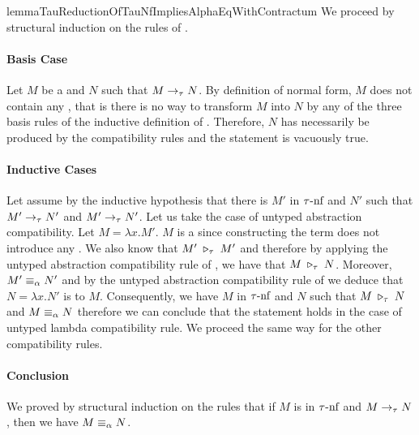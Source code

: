 \begin{longproof}{lemmaTauReductionOfTauNfImpliesAlphaEqWithContractum}
    We proceed by structural induction on the rules of \taureduction.

\paragraph{Basis Case}
    Let $M$ be a \taunormalform and $N$ such that $M \to_\tau N$. By definition of normal form, $M$ does not contain any \tauredex, that is there is no way to transform $M$ into $N$ by any of the three basis rules of the inductive definition of \taureduction. Therefore, $N$ has necessarily be produced by the compatibility rules and the statement is vacuously true.

\paragraph{Inductive Cases}
    Let assume by the inductive hypothesis that there is $M'$ in $\tau\text{-}\text{nf}$ and $N'$ such that $M' \to_\tau N'$ and $M' \to_\tau N'$. Let us take the case of untyped abstraction compatibility.
    Let $M=\lambda x.M'$. $M$ is a \taunormalform since constructing the term does not introduce any \tauredex. We also know that $M' \;\triangleright_\tau\; M'$ and therefore by applying the untyped abstraction compatibility rule of \taureduction, we have that $M \;\triangleright_\tau\; N$. Moreover, $M' \equiv_\alpha N'$ and by the untyped abstraction compatibility rule of \alphaequivalence we deduce that $N=\lambda x.N'$ is \alphaequivalent to $M$. Consequently, we have $M$ in $\tau\text{-}\text{nf}$ and $N$ such that $M \;\triangleright_\tau\; N$ and $M \equiv_\alpha N$ therefore we can conclude that the statement holds in the case of untyped lambda compatibility rule. We proceed the same way for the other compatibility rules.

\paragraph{Conclusion}
    We proved by structural induction on the \taureduction rules that if $M$ is in $\tau\text{-}\text{nf}$ and $M \to_\tau N$, then we have $M \equiv_\alpha N$.    
\end{longproof}